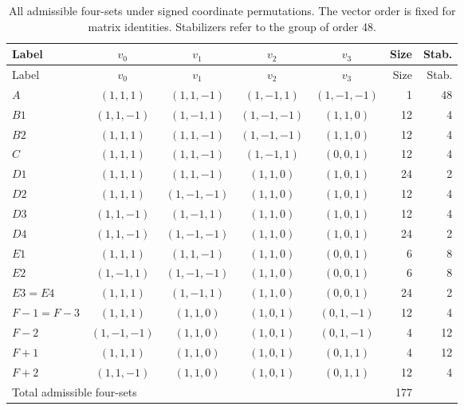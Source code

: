 {\small\setlength{\tabcolsep}{4pt}\renewcommand{\arraystretch}{1.18}
\begin{longtable}{lccccrr}
\caption{All admissible four-sets under signed coordinate permutations. The vector order is fixed for matrix identities. Stabilizers refer to the group of order 48.}\label{tab:orbits}\\
\toprule
Label & $v_0$ & $v_1$ & $v_2$ & $v_3$ & Size & Stab.\\
\midrule\endfirsthead
\toprule
Label & $v_0$ & $v_1$ & $v_2$ & $v_3$ & Size & Stab.\\
\midrule\endhead
$A$ & $(1,1,1)$ & $(1,1,-1)$ & $(1,-1,1)$ & $(1,-1,-1)$ & 1 & 48\\
$B1$ & $(1,1,-1)$ & $(1,-1,1)$ & $(1,-1,-1)$ & $(1,1,0)$ & 12 & 4\\
$B2$ & $(1,1,1)$ & $(1,1,-1)$ & $(1,-1,-1)$ & $(1,1,0)$ & 12 & 4\\
$C$ & $(1,1,1)$ & $(1,1,-1)$ & $(1,-1,1)$ & $(0,0,1)$ & 12 & 4\\
$D1$ & $(1,1,1)$ & $(1,1,-1)$ & $(1,1,0)$ & $(1,0,1)$ & 24 & 2\\
$D2$ & $(1,1,1)$ & $(1,-1,-1)$ & $(1,1,0)$ & $(1,0,1)$ & 12 & 4\\
$D3$ & $(1,1,-1)$ & $(1,-1,1)$ & $(1,1,0)$ & $(1,0,1)$ & 12 & 4\\
$D4$ & $(1,1,-1)$ & $(1,-1,-1)$ & $(1,1,0)$ & $(1,0,1)$ & 24 & 2\\
$E1$ & $(1,1,1)$ & $(1,1,-1)$ & $(1,1,0)$ & $(0,0,1)$ & 6 & 8\\
$E2$ & $(1,-1,1)$ & $(1,-1,-1)$ & $(1,1,0)$ & $(0,0,1)$ & 6 & 8\\
$E3=E4$ & $(1,1,1)$ & $(1,-1,1)$ & $(1,1,0)$ & $(0,0,1)$ & 24 & 2\\
$F{-}1=F{-}3$ & $(1,1,1)$ & $(1,1,0)$ & $(1,0,1)$ & $(0,1,-1)$ & 12 & 4\\
$F{-}2$ & $(1,-1,-1)$ & $(1,1,0)$ & $(1,0,1)$ & $(0,1,-1)$ & 4 & 12\\
$F{+}1$ & $(1,1,1)$ & $(1,1,0)$ & $(1,0,1)$ & $(0,1,1)$ & 4 & 12\\
$F{+}2$ & $(1,1,-1)$ & $(1,1,0)$ & $(1,0,1)$ & $(0,1,1)$ & 12 & 4\\
\midrule
\multicolumn{5}{l}{Total admissible four-sets} & 177 & \\
\bottomrule
\end{longtable}
}
